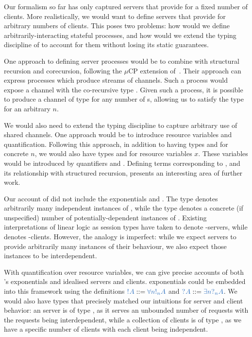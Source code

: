 \documentclass[envcountsame,envcountsect,UKenglish]{llncs}
\begin{document}
Our formalism so far has only captured servers that provide for a fixed number of clients.  More realistically, we would want to define servers that provide for arbitrary numbers of clients.  This poses two problems: how would we define arbitrarily-interacting stateful processes, and how would we extend the typing discipline of \nodcap to account for them without losing its static guarantees.

One approach to defining server processes would be to combine \nodcap with structural recursion and corecursion, following the $\mu\text{CP}$ extension of~\textcite{lindley2016}.  Their approach can express processes which produce streams of  channels. Such a process would expose a channel with the co-recursive type .  Given such a process, it is possible to produce a channel of type  for any number of s, allowing us to satisfy the type  for an arbitrary $n$.

We would also need to extend the typing discipline to capture arbitrary use of shared channels.  One approach would be to introduce resource variables and quantification.  Following this approach, in addition to having types  and  for concrete $n$, we would also have types  and  for resource variables $x$.  These variables would be introduced by quantifiers  and . Defining terms corresponding to , and its relationship with structured recursion, presents an interesting area of further work.

Our account of \hcp did not include the exponentials  and . The type  denotes arbitrarily many independent instances of , while the type  denotes a concrete (if unspecified) number of potentially-dependent instances of .  Existing interpretations of linear logic as session types have taken  to denote -servers, while  denotes -clients.  However, the analogy is imperfect: while we expect servers to provide arbitrarily many instances of their behaviour, we also expect those instances to be interdependent.

With quantification over resource variables, we can give precise accounts of both \cp's exponentials and idealised servers and clients. \cp exponentials could be embedded into this framework using the definitions $\ty{\take{A}} ::= \ty{\forall{n}\take[n]{A}}$ and $\ty{\give{A}} ::= \ty{\exists{n}{\give[n]{A}}}$. We would also have types that precisely matched our intuitions for server and client behavior: an  server is of type , as it serves an unbounded number of requests with the requests being interdependent, while a collection of  clients is of type , as we have a specific number of clients with each client being independent.

\printbibliography
\end{document}
